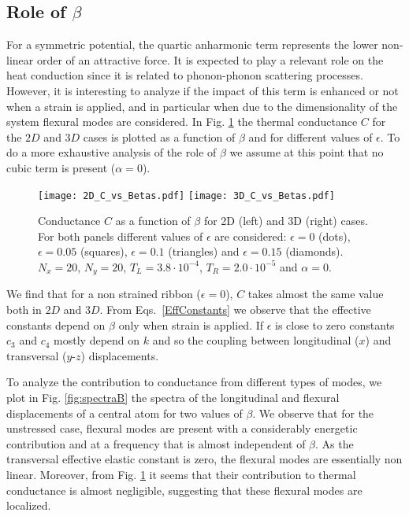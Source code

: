 \documentclass[12pt]{article}
\begin{document}
\subsection*{\textbf{Role of $\beta$}}%

For a symmetric potential, the quartic anharmonic term represents the lower non-linear order of an attractive force. It is expected to play a relevant role on the heat conduction since it is related to phonon-phonon scattering processes. However, it is interesting to analyze if the impact of this term is enhanced or not when a strain is applied, and in particular when due to the dimensionality of the system flexural modes are considered. In Fig. \ref{fig:beta} the thermal conductance $C$ for the $2D$ and $3D$ cases is plotted as a function of $\beta$ and for different values of $\epsilon$. To do a more exhaustive analysis of the role of $\beta$ we assume at this point that no cubic term is present ($\alpha=0$).

\begin{figure}[ht]
 	\begin{center}
 		\texttt{[image: 2D\_C\_vs\_Betas.pdf]}
 		\texttt{[image: 3D\_C\_vs\_Betas.pdf]}
 	\end{center}  
\caption{Conductance $C$ as a function of $\beta$ for 2D (left) and 3D (right) cases. For both panels different values of $\epsilon$ are considered: $\epsilon=0$ (dots), $\epsilon=0.05$ (squares), $\epsilon=0.1$ (triangles) and  $\epsilon=0.15$ (diamonds). $N_x =20$, $N_y =20$, $T_{L}=3.8\cdot 10^{-4}$, $T_{R}=2.0\cdot 10^{-5}$ and $\alpha=0 $.}
\label{fig:beta}
\end{figure}

We find that for a non strained ribbon ($\epsilon= 0$), $C$ takes almost the same value both in $2D$ and $3D$. From Eqs.~\ref{EffConstants} we observe that the effective constants depend on $\beta$ only when strain is applied. If $\epsilon$ is close to zero constants $c_3$ and $c_4$ mostly depend on $k$ and so the coupling between longitudinal ($x$) and transversal ($y$-$z$) displacements.

To analyze the contribution to conductance from different types of modes, we plot in Fig. \ref{fig:spectraB} the spectra of the longitudinal and flexural displacements of a central atom for two values of $\beta$. We observe that for the unstressed case, flexural modes are present with a considerably energetic contribution and at a frequency that is almost independent of $\beta$. As the transversal effective elastic constant is zero, the flexural modes are essentially non linear. Moreover, from Fig. \ref{fig:beta} it seems that their contribution to thermal conductance is almost negligible, suggesting that these flexural modes are localized.
\end{document}
